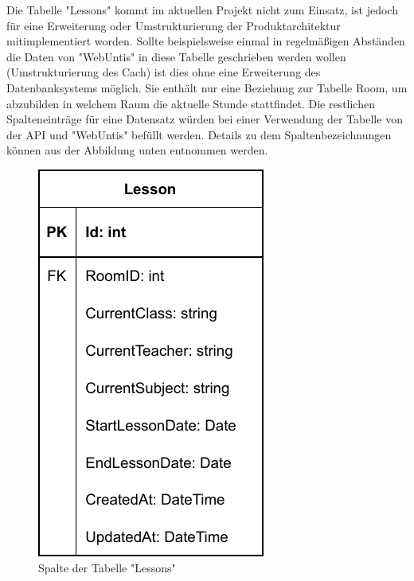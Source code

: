 Die Tabelle "Lessons" kommt im aktuellen Projekt nicht zum Einsatz, ist jedoch für eine Erweiterung oder Umstrukturierung der Produktarchitektur mitimplementiert worden. Sollte beispielsweise einmal in regelmäßigen Abständen die Daten von "WebUntis" in diese Tabelle geschrieben werden wollen (Umstrukturierung des Cach) ist dies ohne eine Erweiterung des Datenbanksystems möglich. Sie enthält nur eine Beziehung zur Tabelle Room, um abzubilden in welchem Raum die aktuelle Stunde stattfindet. Die restlichen Spalteneinträge für eine Datensatz würden bei einer Verwendung der Tabelle von der API und "WebUntis" befüllt werden. Details zu dem Spaltenbezeichnungen können aus der Abbildung unten entnommen werden.

\begin{figure}[H]
    \centering
    \includegraphics{media/MariaDB/Lesson.svg.pdf}
    \caption{Spalte der Tabelle "Lessons"}
\end{figure}
